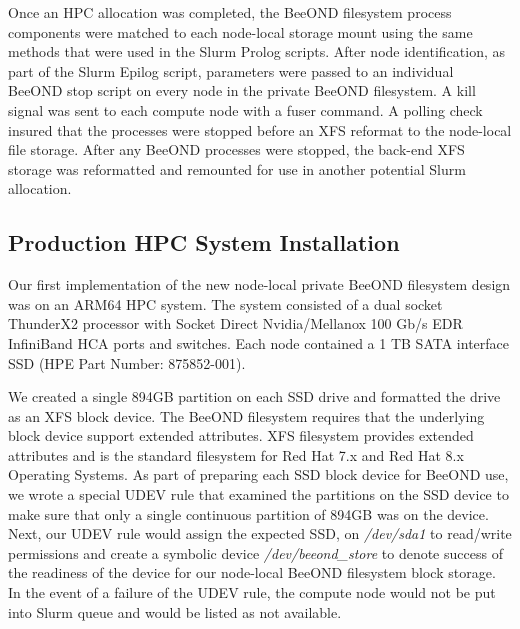 Once an HPC allocation was completed, the BeeOND filesystem process components were matched to each node-local storage mount using the same methods that were used in the Slurm Prolog scripts. After node identification, as part of the Slurm Epilog script, parameters were passed to an individual BeeOND stop script on every node in the private BeeOND filesystem.  A kill signal was sent to each compute node with a fuser command.  A polling check insured that the processes were stopped before an XFS reformat to the node-local file storage. After any BeeOND processes were stopped, the back-end XFS storage was reformatted and remounted for use in another potential Slurm allocation.

\subsection{Production HPC System Installation}


Our first implementation of the new node-local private BeeOND filesystem design was on an ARM64 HPC system.  The system consisted of a dual socket ThunderX2 processor with Socket Direct Nvidia/Mellanox 100 Gb/s EDR InfiniBand HCA ports and switches.  Each node contained a 1 TB SATA interface SSD (HPE Part Number: 875852-001).  


We created a single 894GB partition on each SSD drive and formatted the drive as an XFS block device.  The BeeOND filesystem requires that the underlying block device support extended attributes. XFS filesystem provides extended attributes and is the standard filesystem for Red Hat 7.x and Red Hat 8.x Operating Systems.  As part of preparing each SSD block device for BeeOND use, we wrote a special UDEV rule that examined the partitions on the SSD device to make sure that only a single continuous partition of 894GB was on the device.  Next, our UDEV rule would assign the expected SSD, on \textit{/dev/sda1} to read/write permissions and create a symbolic device \textit{/dev/beeond\_store} to denote success of the readiness of the device for our node-local BeeOND filesystem block storage.  In the event of a failure of the UDEV rule, the compute node would not be put into Slurm queue and would be listed as not available.  

